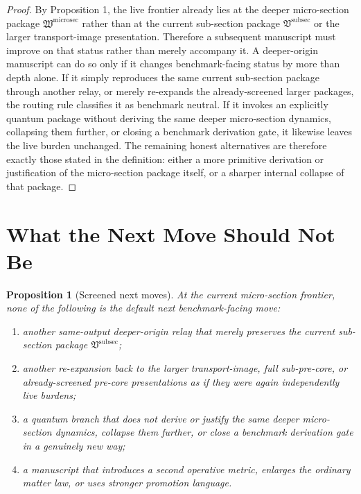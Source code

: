 \documentclass[11pt]{article}
\newcommand{\SubSectionPackage}{\mathfrak V^{\mathrm{subsec}}}
\newcommand{\MicroSectionPackage}{\mathfrak W^{\mathrm{microsec}}}
\newtheorem{proposition}{Proposition}
\begin{document}
\begin{proof}
By Proposition 1, the live frontier already lies at the deeper micro-section package \(\MicroSectionPackage\) rather than at the current sub-section package \(\SubSectionPackage\) or the larger transport-image presentation. Therefore a subsequent manuscript must improve on that status rather than merely accompany it. A deeper-origin manuscript can do so only if it changes benchmark-facing status by more than depth alone. If it simply reproduces the same current sub-section package through another relay, or merely re-expands the already-screened larger packages, the routing rule classifies it as benchmark neutral. If it invokes an explicitly quantum package without deriving the same deeper micro-section dynamics, collapsing them further, or closing a benchmark derivation gate, it likewise leaves the live burden unchanged. The remaining honest alternatives are therefore exactly those stated in the definition: either a more primitive derivation or justification of the micro-section package itself, or a sharper internal collapse of that package.
\end{proof}

\section{What the Next Move Should Not Be}

\begin{proposition}[Screened next moves]
At the current micro-section frontier, none of the following is the default next benchmark-facing move:
\begin{enumerate}
    \item another same-output deeper-origin relay that merely preserves the current sub-section package \(\SubSectionPackage\);
    \item another re-expansion back to the larger transport-image, full sub-pre-core, or already-screened pre-core presentations as if they were again independently live burdens;
    \item a quantum branch that does not derive or justify the same deeper micro-section dynamics, collapse them further, or close a benchmark derivation gate in a genuinely new way;
    \item a manuscript that introduces a second operative metric, enlarges the ordinary matter law, or uses stronger promotion language.
\end{enumerate}
\end{proposition}
\end{document}
